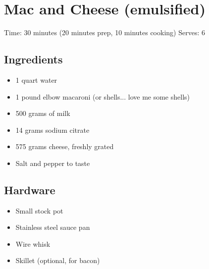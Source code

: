 \section{Mac and Cheese (emulsified)}
\label{macAndCheeseEmulsified}
\setcounter{secnumdepth}{0}
Time: 30 minutes (20 minutes prep, 10 minutes cooking)
Serves: 6

\begin{multicols}{2}
\subsection*{Ingredients}
\begin{itemize}
    \item 1 quart water
    \item 1 pound elbow macaroni (or shells... love me some shells)
    \item 500 grams of milk
    \item 14 grams sodium citrate
    \item 575 grams cheese, freshly grated
    \item Salt and pepper to taste
\end{itemize}

\subsection*{Hardware}
\begin{itemize}
    \item Small stock pot
    \item Stainless steel sauce pan
    \item Wire whisk
    \item Skillet (optional, for bacon)
\end{itemize}
\clearpage


\end{multicols}
